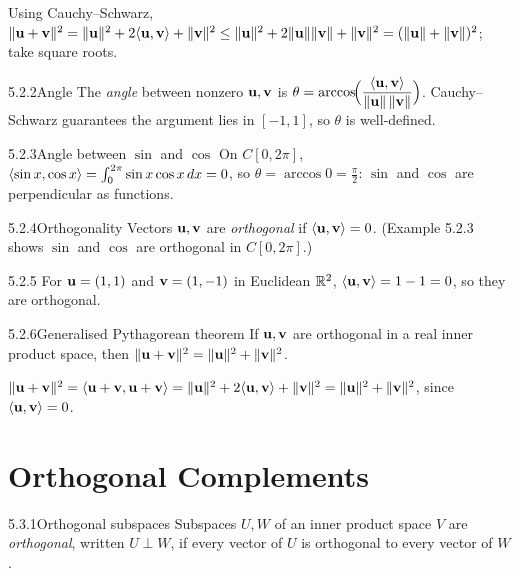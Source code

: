 \begin{prf}
Using Cauchy--Schwarz, $\lVert \mathbf{u}+\mathbf{v} \rVert^2=\lVert \mathbf{u} \rVert^2+2\langle \mathbf{u}, \mathbf{v} \rangle+\lVert \mathbf{v} \rVert^2\le\lVert \mathbf{u} \rVert^2+2\lVert \mathbf{u} \rVert\lVert \mathbf{v} \rVert+\lVert \mathbf{v} \rVert^2=(\lVert \mathbf{u} \rVert+\lVert \mathbf{v} \rVert)^2$; take square roots.
\end{prf}

\begin{defns}{5.2.2}{Angle}
The \emph{angle} between nonzero $\mathbf{u},\mathbf{v}$ is $\theta=\arccos\!\Bigl(\dfrac{\langle \mathbf{u}, \mathbf{v} \rangle}{\lVert \mathbf{u} \rVert\,\lVert \mathbf{v} \rVert}\Bigr)$. Cauchy--Schwarz guarantees the argument lies in $[-1,1]$, so $\theta$ is well-defined.
\end{defns}

\begin{exmp}{5.2.3}{Angle between $\sin$ and $\cos$}
On $C[0,2\pi]$, $\langle \sin x, \cos x \rangle=\int_0^{2\pi}\sin x\cos x\,dx=0$, so $\theta=\arccos 0=\tfrac\pi2$: $\sin$ and $\cos$ are perpendicular as functions.
\end{exmp}

\begin{defns}{5.2.4}{Orthogonality}
Vectors $\mathbf{u},\mathbf{v}$ are \emph{orthogonal} if $\langle \mathbf{u}, \mathbf{v} \rangle=0$. (Example 5.2.3 shows $\sin$ and $\cos$ are orthogonal in $C[0,2\pi]$.)
\end{defns}

\begin{exmp}{5.2.5}{}
For $\mathbf{u}=(1,1)$ and $\mathbf{v}=(1,-1)$ in Euclidean $\mathbb{R}^2$, $\langle \mathbf{u}, \mathbf{v} \rangle=1-1=0$, so they are orthogonal.
\end{exmp}

\begin{thms}{5.2.6}{Generalised Pythagorean theorem}
If $\mathbf{u},\mathbf{v}$ are orthogonal in a real inner product space, then $\lVert \mathbf{u}+\mathbf{v} \rVert^2=\lVert \mathbf{u} \rVert^2+\lVert \mathbf{v} \rVert^2$.
\end{thms}

\begin{prf}
$\lVert \mathbf{u}+\mathbf{v} \rVert^2=\langle \mathbf{u}+\mathbf{v}, \mathbf{u}+\mathbf{v} \rangle=\lVert \mathbf{u} \rVert^2+2\langle \mathbf{u}, \mathbf{v} \rangle+\lVert \mathbf{v} \rVert^2=\lVert \mathbf{u} \rVert^2+\lVert \mathbf{v} \rVert^2$, since $\langle \mathbf{u}, \mathbf{v} \rangle=0$.
\end{prf}

\section{Orthogonal Complements}
\label{sec:5.3}

\begin{defns}{5.3.1}{Orthogonal subspaces}
Subspaces $U,W$ of an inner product space $V$ are \emph{orthogonal}, written $U\perp W$, if every vector of $U$ is orthogonal to every vector of $W$.
\end{defns}

